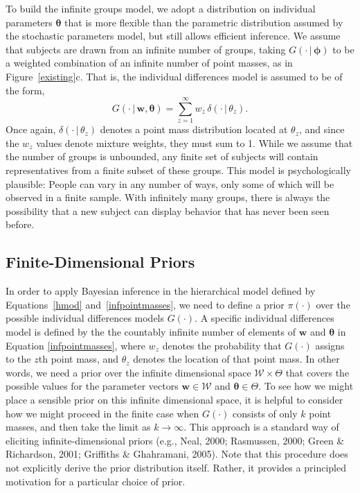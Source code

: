\documentclass[authoryear]{elsarticle}
\newcommand{\condon}{\,|\,}
\newcommand{\vctr}[1]{\bm{#1}}
\newcommand{\panel}[1]{#1}
\begin{document}
To build the infinite groups model, we adopt a distribution on individual
parameters $\vctr{\theta}$ that is more flexible than the parametric
distribution assumed by the stochastic parameters model, but still allows
efficient inference. We assume that subjects are drawn from an infinite
number of groups, taking $G(\cdot \condon \vctr{\phi})$ to be a
weighted combination of an infinite number of point masses, as in
Figure~\ref{existing}\panel{c}. That is, the individual
differences model is assumed to be of the form,
\begin{equation}
        \label{infpointmasses}
        G(\cdot \condon \vctr{w},\vctr{\theta}) =
        \sum_{z=1}^{\infty} w_z \, \delta(\cdot \condon \theta_z).
\end{equation}
\noindent Once again, $\delta(\cdot \condon \theta_z)$ denotes a
point mass distribution located at $\theta_z$, and since the $w_z$
values denote mixture weights, they must sum to 1. While we assume
that the number of groups is unbounded, any finite set of subjects will
contain representatives from a finite subset of these groups. This model
is psychologically plausible: People can vary in any number of ways,
only some of which will be observed in a finite sample. With infinitely
many groups, there is always the possibility that a new subject can
display behavior that has never been seen before.

\subsection{Finite-Dimensional Priors}

In order to apply Bayesian inference in the hierarchical model defined by
Equations~\ref{hmod} and~\ref{infpointmasses}, we need to define a prior
$\pi(\cdot)$ over the possible individual differences models $G(\cdot)$.
A specific individual differences model is defined by the the countably infinite
number of elements of $\vctr{w}$ and $\vctr{\theta}$ in Equation
\ref{infpointmasses}, where $w_z$ denotes the probability that
$G(\cdot)$ assigns to the $z$th point mass, and $\theta_z$ denotes the
location of that point mass. In other words, we need a prior over the infinite
dimensional space $\mathcal{W} \times\Theta$ that covers the possible values
for the parameter vectors $\vctr{w} \in \mathcal{W}$ and $\vctr{\theta} \in
\Theta $. To see how we might place a sensible prior on this infinite dimensional
space, it is helpful to consider how we might proceed in the finite case when
$G(\cdot)$ consists of only $k$ point masses, and then take the limit as
$k \rightarrow \infty$. This approach is a standard way of eliciting
infinite-dimensional priors  (e.g., Neal, 2000; Rasmussen, 2000; Green
\& Richardson, 2001; Griffiths \& Ghahramani, 2005). Note that this procedure
does not explicitly derive the prior distribution itself. Rather, it provides a
principled motivation for a particular choice of prior.
\end{document}
